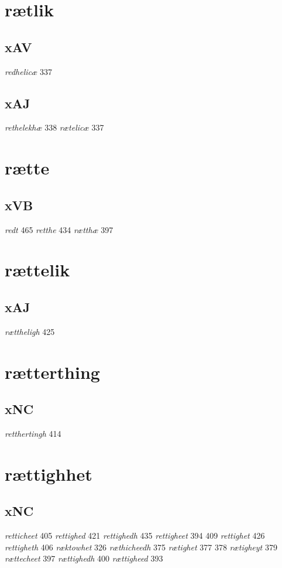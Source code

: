\documentclass[a4paper,twocolumn]{article}
\begin{document}
\section{rætlik}
\label{sec:orga4d3bc1}
\subsection{xAV}
\label{sec:orgfe09301}
\emph{redhelicæ} 337 
\subsection{xAJ}
\label{sec:org2354481}
\emph{rethelekhæ} 338 \emph{rætelicæ} 337 
\section{rætte}
\label{sec:orgb7275cb}
\subsection{xVB}
\label{sec:org2335d70}
\emph{redt} 465 \emph{retthe} 434 \emph{rætthæ} 397 
\section{rættelik}
\label{sec:orgcd704d9}
\subsection{xAJ}
\label{sec:orged0dbb6}
\emph{rættheligh} 425 
\section{rætterthing}
\label{sec:orgc59b568}
\subsection{xNC}
\label{sec:org408b53a}
\emph{retthertingh} 414 
\section{rættighhet}
\label{sec:orgfd7ff6d}
\subsection{xNC}
\label{sec:orga85ff94}
\emph{retticheet} 405 \emph{rettighed} 421 \emph{rettighedh} 435 \emph{rettigheet} 394 409 \emph{rettighet} 426 \emph{rettigheth} 406 \emph{ræktowhet} 326 \emph{ræthicheedh} 375 \emph{rætighet} 377 378 \emph{rætigheyt} 379 \emph{rættecheet} 397 \emph{rættighedh} 400 \emph{rættigheed} 393 
\end{document}
